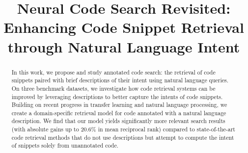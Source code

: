 \documentclass[12pt,conference, onecolumn]{IEEEtran}
\begin{document}
\title{Neural Code Search Revisited: Enhancing Code Snippet Retrieval through Natural Language Intent} 

\author{
\and
{}
}

\maketitle

\begin{abstract}
In this work, we propose and study annotated code search: the retrieval of code snippets paired with brief descriptions of their intent using natural language queries. On three benchmark datasets, we investigate how code retrieval systems can be improved by leveraging descriptions to better capture the intents of code snippets. Building on recent progress in transfer learning and natural language processing, we create a domain-specific retrieval model for code annotated with a natural language description. We find that our model yields significantly more relevant search results (with absolute gains up to 20.6\% in mean reciprocal rank) compared to state-of-the-art code retrieval methods that do not use descriptions but attempt to compute the intent of snippets solely from unannotated code.
\end{abstract}


\newcommand\tom[1]{\textcolor{red}{\textbf{Tom:~}#1~}}
\newcommand\repourl{\url{https://github.com/nokia/codesearch}}
\newcommand\tagseturl{\url{https://github.com/nokia/codesearch/tree/master/nbs/datasets/so-ds-tags.txt}}



\lstset{style=mystyle}
\end{document}
